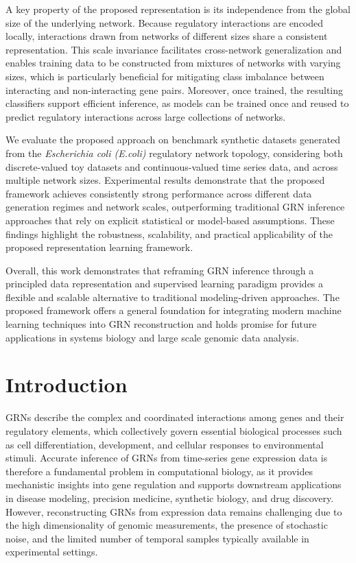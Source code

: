 A key property of the proposed representation is its independence from the global size of the underlying network. Because regulatory interactions are encoded locally, interactions drawn from networks of different sizes share a consistent representation. This scale invariance facilitates cross-network generalization and enables training data to be constructed from mixtures of networks with varying sizes, which is particularly beneficial for mitigating class imbalance between interacting and non-interacting gene pairs. Moreover, once trained, the resulting classifiers support efficient inference, as models can be trained once and reused to predict regulatory interactions across large collections of networks.

We evaluate the proposed approach on benchmark synthetic datasets generated from the \textit{Escherichia coli (E.coli)} regulatory network topology, considering both discrete-valued toy datasets and continuous-valued time series data, and across multiple network sizes. Experimental results demonstrate that the proposed framework achieves consistently strong performance across different data generation regimes and network scales, outperforming traditional GRN inference approaches that rely on explicit statistical or model-based assumptions. These findings highlight the robustness, scalability, and practical applicability of the proposed representation learning framework.

Overall, this work demonstrates that reframing GRN inference through a principled data representation and supervised learning paradigm provides a flexible and scalable alternative to traditional modeling-driven approaches. The proposed framework offers a general foundation for integrating modern machine learning techniques into GRN reconstruction and holds promise for future applications in systems biology and large scale genomic data analysis.

\section{Introduction}
GRNs describe the complex and coordinated interactions among genes and their regulatory elements, which collectively govern essential biological processes such as cell differentiation, development, and cellular responses to environmental stimuli. Accurate inference of GRNs from time-series gene expression data is therefore a fundamental problem in computational biology, as it provides mechanistic insights into gene regulation and supports downstream applications in disease modeling, precision medicine, synthetic biology, and drug discovery. However, reconstructing GRNs from expression data remains challenging due to the high dimensionality of genomic measurements, the presence of stochastic noise, and the limited number of temporal samples typically available in experimental settings.

